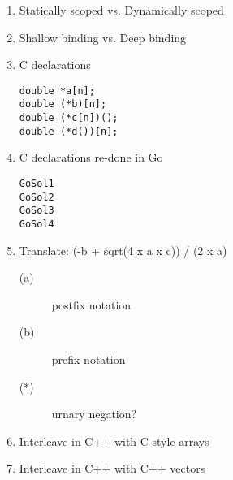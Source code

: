\documentclass{article}
\begin{document}
\begin{enumerate}
\pagebreak
\item Statically scoped vs. Dynamically scoped
\pagebreak
\item Shallow binding vs. Deep binding
\pagebreak
\item C declarations
\begin{verbatim}
double *a[n];
double (*b)[n];
double (*c[n])();
double (*d())[n];
\end{verbatim}
\pagebreak
\item C declarations re-done in Go
\begin{verbatim}
GoSol1
GoSol2
GoSol3
GoSol4
\end{verbatim}
\pagebreak
\item Translate: (-b + sqrt(4 x a x c)) / (2 x a)
\begin{description}
    \item[(a)] postfix notation
    \item[(b)] prefix notation
    \item[(*)] urnary negation?
\end{description}
\pagebreak
\item Interleave in C++ with C-style arrays
\pagebreak
\item Interleave in C++ with C++ vectors
\pagebreak
\end{enumerate}
\end{document}
